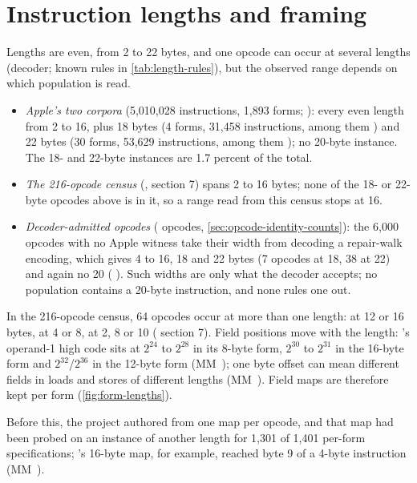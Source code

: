 \section{Instruction lengths and framing}\label{sec:framing}

Lengths are even, from 2 to 22 bytes, and one opcode can occur at several lengths (decoder; known rules in
\cref{tab:length-rules}), but the observed range depends on which population is read.

\begin{itemize}
\item \emph{Apple's two corpora} (5,010,028 instructions, 1,893 forms; ): every even length
  from 2 to 16, plus 18 bytes (4 forms, 31,458 instructions, among them ) and 22 bytes (30 forms,
  53,629 instructions, among them ); no 20-byte instance. The 18- and 22-byte instances are
  1.7 percent of the total.
\item \emph{The 216-opcode census} (,  section 7) spans 2 to 16 bytes; none of
  the 18- or 22-byte opcodes above is in it, so a range read from this census stops at 16.
\item \emph{Decoder-admitted opcodes} ( opcodes, \cref{sec:opcode-identity-counts}): the 6,000 opcodes with no Apple witness take their width
  from decoding a repair-walk encoding, which gives 4 to 16, 18 and 22 bytes (7 opcodes at 18, 38 at 22) and again no
  20 ( ). Such widths are only what
  the decoder accepts; no population contains a 20-byte instruction, and none rules one out.
\end{itemize}

In the 216-opcode census, 64 opcodes occur at more than one length:  at 12 or 16 bytes,
 at 4 or 8,  at 2, 8 or 10
( section 7). Field positions move with the length: 's operand-1
high code sits at $2^{24}$ to $2^{28}$ in its 8-byte form, $2^{30}$ to $2^{31}$ in the 16-byte form and $2^{32}$/$2^{36}$ in the 12-byte form (MM~); one byte
offset can mean different fields in loads and stores of different lengths (MM~).
Field maps are therefore kept per form (\cref{fig:form-lengths}).


 Before this, the project authored from one map per opcode, and that map had
been probed on an instance of another length for 1,301 of 1,401 per-form specifications; 's 16-byte map, for
example, reached byte 9 of a 4-byte instruction (MM~).

